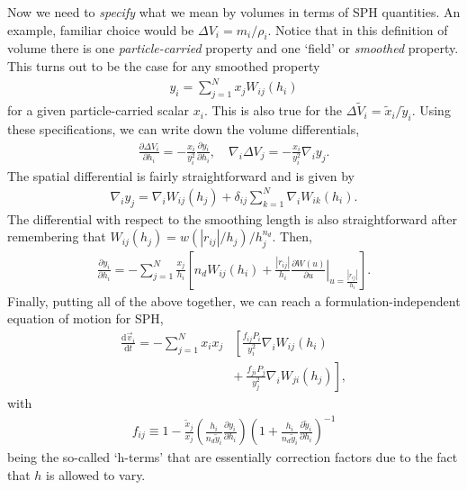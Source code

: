 Now we need to \emph{specify} what we mean by volumes in terms of SPH
quantities. An example, familiar choice would be $\Delta V_i = m_i/\rho_i$.
Notice that in this definition of volume there is one \emph{particle-carried}
property and one `field' or \emph{smoothed} property. This turns out to be the
case for any smoothed property
\begin{align}
  y_i = \sum^N_{j=1} x_j W_{ij}(h_i)
  \label{eqn:sph:derivation:smoothed}
\end{align}
for a given particle-carried scalar $x_i$. This is also true for the $\Delta
\tilde{V}_i = \tilde{x}_i/\tilde{y}_i$. Using these specifications, we can write
down the volume differentials,
\begin{align}
  \frac{\partial \Delta V_i}{\partial h_i} =
    -\frac{x_i}{y_i^2}\frac{\partial y_i}{\partial h_i},
    \quad
  \nabla_i \Delta V_j = -\frac{x_i}{y_i^2} \nabla_i y_j.
  \label{eqn:sph:derivation:volumediffs}
\end{align}
The spatial differential is fairly straightforward and is given by
\begin{align}
  \nabla_i y_j = \nabla_i W_{ij}(h_j)
    + \delta_{ij}\sum_{k=1}^N \nabla_i W_{ik}(h_i).
  \label{eqn:sph:derivation:nablay}
\end{align}
The differential with respect to the smoothing length is also straightforward
after remembering that $W_{ij}(h_j) = w(|r_{ij}|/h_j)/h_j^{n_d}$. Then,
\begin{align}
  \frac{\partial y_i}{\partial h_i} = -\sum_{j=1}^N \frac{x_j}{h_i}
  \left[
    n_d W_{ij}(h_i) + \frac{|r_{ij}|}{h_i}
    \left. 
      \frac{\partial W(u)}{\partial u}
    \right|_{u=\frac{|r_{ij}|}{h_i}}
  \right].
  \label{eqn:sph:derivation:dydh}
\end{align}
Finally, putting all of the above together, we can reach a
formulation-independent equation of motion for SPH,
\begin{align}
  \frac{\mathrm{d}\vec{v}_i}{\mathrm{d}t} = -\sum_{j=1}^N x_i x_j
  & \left[ \frac{f_{ij}P_i}{y_i^2} \nabla_i W_{ij}(h_i) \right. \nonumber \\
  & \left. + ~ \frac{f_{ji} P_j}{y_j^2}\nabla_i W_{ji}(h_j)\right],
  \label{eqn:sph:derivation:spheom}
\end{align}
with
\begin{align}
  f_{ij} \equiv 1 - 
    \frac{\tilde{x}_j}{x_j}
    \left(
      \frac{h_i}{n_d \tilde{y}_i} \frac{\partial y_i}{\partial h_i}
    \right)
    \left(
      1+\frac{h_i}{n_d \tilde{y}_i} \frac{\partial \tilde{y}_i}{\partial h_i}
    \right)^{-1}
  \label{eqn:sph:derivation:fij}
\end{align}
being the so-called `h-terms' that are essentially correction factors due to the
fact that $h$ is allowed to vary.

